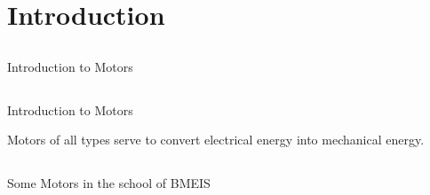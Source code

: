 
%
%
%
%
%
%
%


\section{Introduction}

\subsection{}
{
\begin{frame}{Introduction to Motors}

	\vspace{-3mm}
  	\begin{figure}
   	\end{figure}


\end{frame}
}

\subsection{}
{
\begin{frame}{Introduction to Motors}

\LARGE 
Motors of all types serve to convert electrical energy into mechanical energy. 



\end{frame}
}


\subsection{}
{
\begin{frame}{Some Motors in the school of BMEIS}

	\vspace{-3mm}
   	\begin{figure}
 	\end{figure}


\end{frame}
}


